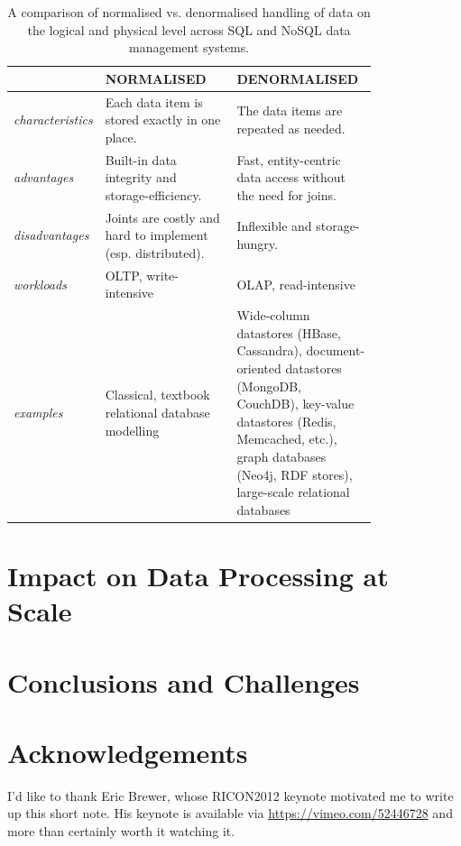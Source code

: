 \documentclass{llncs}
\begin{document}
\begin{center}
\begin{table}
\caption{A comparison of normalised vs. denormalised handling of data on the 
logical and physical level across SQL and NoSQL data management systems.}
\label{tab:ndcomparison}
\begin{tabular}{l @{\hskip 2mm} p{0.40\linewidth} @{\hskip 5mm}
	            p{0.40\linewidth} @{\hskip 2mm}}
& \textbf{NORMALISED}& \textbf{DENORMALISED}\\
\hline
\hline
\emph{characteristics}&
Each data item is stored exactly in one place.&
The data items are repeated as needed.\\
\hline
\emph{advantages}&
Built-in data integrity and storage-efficiency.&
Fast, entity-centric data access without the need for joins.\\
\hline
\emph{disadvantages} &
Joints are costly and hard to implement (esp. distributed).&
Inflexible and storage-hungry.\\
\hline
\emph{workloads} &
OLTP, write-intensive&
OLAP, read-intensive\\
\hline
\emph{examples} &
Classical, textbook relational database modelling&
Wide-column datastores (HBase, Cassandra), document-oriented 
datastores (MongoDB, CouchDB), key-value datastores (Redis, Memcached, etc.),
graph databases (Neo4j, RDF stores), large-scale relational databases\\
\hline
\hline
\end{tabular}
\centering
\end{table}
\end{center}


\section{Impact on Data Processing at Scale}
\label{sec:ldp}


\section{Conclusions and Challenges}
\label{sec:concl}

\section{Acknowledgements}
\label{sec:ack}
I'd like to thank Eric Brewer, whose RICON2012 keynote motivated me to write up
this short note. His keynote is available via \url{https://vimeo.com/52446728} 
and more than certainly worth it watching it.



\end{document}
